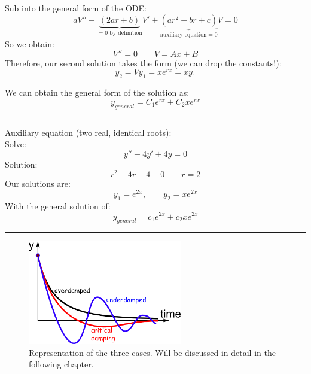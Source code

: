 Sub into the general form of the ODE:
\begin{equation}
aV''+\underbrace{(2ar+b)}_{=0\text{ by definition}}V'+\underbrace{(ar^2+br+c)}_{\text{auxiliary equation} =0}V=0
\end{equation}
So we obtain:
\begin{equation*}
V''=0 \qquad V=Ax+B
\end{equation*}
Therefore, our second solution takes the form (we can drop the constants!):
\begin{equation*}
y_2=V y_1=x e^{rx}=xy_1
\end{equation*}

We can obtain the general form of the solution as:
\begin{equation}
\boxed{y_{general}=C_1e^{rx}+C_2x e^{rx}}
\end{equation}

\begin{center}
\noindent\rule{4cm}{0.4pt}
\end{center}

\begin{exmp}{Auxiliary equation (two real, identical roots):}\\
Solve:
\begin{equation*}
y''-4y'+4y=0
\end{equation*}
Solution:
\begin{equation*}
r^2-4r+4-0 \qquad r=2
\end{equation*}
Our solutions are:
\begin{equation*}
y_1=e^{2x},\qquad y_2=xe^{2x}
\end{equation*}
With the general solution of:
\begin{equation*}
y_{general}=c_1e^{2x}+c_2xe^{2x}
\end{equation*}

\end{exmp}

\begin{center}
\noindent\rule{4cm}{0.4pt}
\end{center}


\begin{figure}
\centering
\includegraphics[width=0.6\textwidth]{./figs/SpringCases.png}
\caption{Representation of the three cases. Will be discussed in detail in the following chapter.}
\end{figure}
